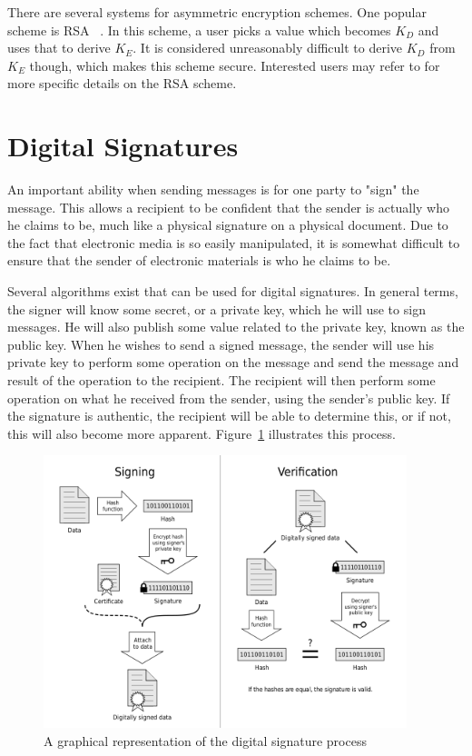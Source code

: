 There are several systems for asymmetric encryption schemes. One popular scheme is RSA ~\cite{RSA}. In this scheme, a user picks a value which becomes
$K_D$ and uses that to derive $K_E$. It is considered unreasonably difficult to derive $K_D$ from $K_E$ though, which makes this scheme secure.
Interested users may refer to \cite{RSA} for more specific details on the RSA scheme.


\section{Digital Signatures}
An important ability when sending messages is for one party to "sign" the message. This
allows a recipient to be confident that the sender is actually who he claims to be, much
like a physical signature on a physical document. Due to the fact that electronic media
is so easily manipulated, it is somewhat difficult to ensure that the sender of electronic
materials is who he claims to be.

Several algorithms exist that can be used for digital signatures. In general terms, the signer
will know some secret, or a private key,
 which he will use to sign messages. He will
also publish some value related to the private key, known as the public key. When he wishes
to send a signed message, the sender will use his private key to perform some operation
on the message and send the message and result of the operation to the recipient. 
The recipient will then perform some operation on what he 
received from the sender, using the sender's public key. If the signature is authentic, the
recipient will be able to determine this, or if not, this will also become more apparent.
Figure~\ref{fig:signing} illustrates this process.

\begin{figure}[!ht]
\includegraphics[width=400px]{images/signing.png}
\caption{A graphical representation of the digital signature process \cite{signing}}
\label{fig:signing}
\end{figure}


